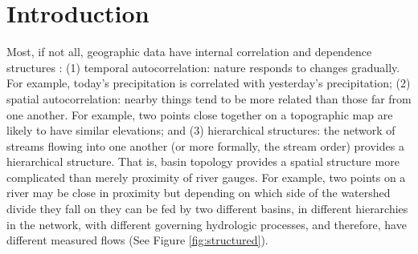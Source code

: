 \section{Introduction} \label{ch5:introduction}
Most, if not all, geographic data have internal correlation and dependence structures \cite{legendre1993spatial}: (1) temporal autocorrelation: nature responds to changes gradually. For example, today's precipitation is correlated with yesterday's precipitation; (2) spatial autocorrelation: nearby things tend to be more related than those far from one another. For example, two points close together on a topographic map are likely to have similar elevations;  and (3) hierarchical structures: the network of streams flowing into one another (or more formally, the stream order) provides a hierarchical structure. That is, basin topology provides a spatial structure more complicated than merely proximity of river gauges. For example, two points on a river may be close in proximity but depending on which side of the watershed divide they fall on they can be fed by two different basins, in different hierarchies in the network, with different governing hydrologic processes, and therefore, have different measured flows (See Figure \ref{fig:structured}). 


